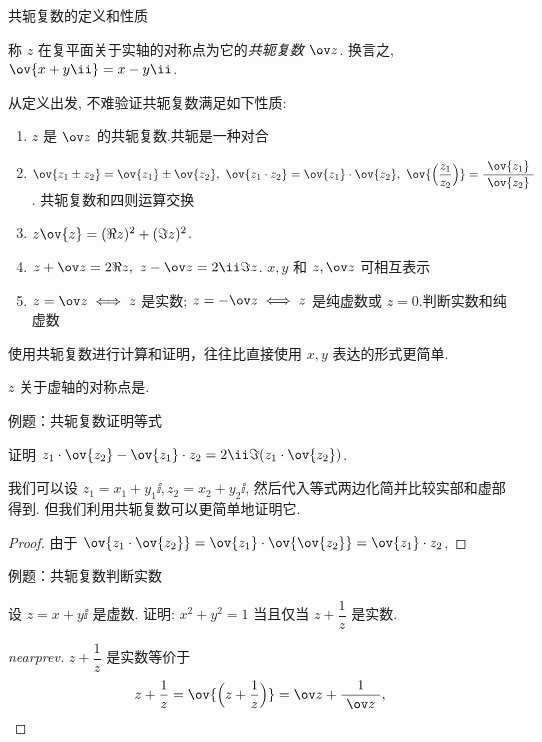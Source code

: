 \begin{frame}{共轭复数的定义和性质}
	\onslide<+->
	\begin{definition}
		称 $z$ 在复平面关于实轴的对称点为它的\emph{共轭复数 $\ov z$}.
		换言之, $\ov{x+y\ii}=x-y\ii$.
	\end{definition}
	\onslide<+->
	从定义出发, 不难验证共轭复数满足如下性质:
	\begin{enumerate}\bf
		\item $z$ 是 $\ov z$ 的共轭复数.\hfill\alert{共轭是一种对合}
		\item $\ov{z_1\pm z_2}=\ov{z_1}\pm\ov{z_2},\ 
		\ov{z_1\cdot z_2}=\ov{z_1}\cdot\ov{z_2},\ 
		\ov{\Bigl(\dfrac{z_1}{z_2}\Bigr)}=\dfrac{~\ov{z_1}~}{~\ov{z_2}~}$.
		\hfill \alert{共轭复数和四则运算交换}
		\item $z\ov{z}=(\Re z)^2+(\Im z)^2$.
		\item $z+\ov z=2\Re z,\ z-\ov z=2\ii\Im z$.
		\hfill \alert{$x,y$ 和 $z,\ov z$ 可相互表示}
		\item $z=\ov z\iff z$ 是实数; $z=-\ov z\iff z$ 是纯虚数或 $z=0$.\hfill\alert{判断实数和纯虚数}
	\end{enumerate}

	\onslide<+->
	使用共轭复数进行计算和证明，往往比直接使用 $x,y$ 表达的形式更简单.
	\onslide<+->
	\begin{exercise}
		$z$ 关于虚轴的对称点是.
	\end{exercise}
\end{frame}


\begin{frame}{例题：共轭复数证明等式}
	\onslide<+->
	\begin{example}
		证明 $z_1\cdot\ov{z_2}-\ov{z_1}\cdot z_2=2\ii\Im(z_1\cdot\ov{z_2})$.
	\end{example}
	\onslide<+->
	我们可以设 $z_1=x_1+y_1\ii,z_2=x_2+y_2\ii$, 然后代入等式两边化简并比较实部和虚部得到.
	\onslide<+->
	但我们利用共轭复数可以更简单地证明它.
	\onslide<+->
	\begin{proof}
		由于 $\ov{z_1\cdot\ov{z_2}}=\ov{z_1}\cdot\ov{\ov{z_2}}=\ov{z_1}\cdot z_2$, 
		\bigdel
	\end{proof}
\end{frame}


\begin{frame}{例题：共轭复数判断实数}
	\onslide<+->
	\begin{example}[nearnext]
		设 $z=x+y\ii$ 是虚数.
		证明: $x^2+y^2=1$ 当且仅当 $z+\dfrac 1z$ 是实数.
	\end{example}
	\onslide<+->
	\begin{proof}[nearprev]
		$z+\dfrac 1z$ 是实数等价于
		\[
			z+\dfrac 1z=\ov{\Bigl(z+\dfrac 1z\Bigr)}=\ov z+\dfrac1{~\ov z~},
		\]
		\onslide<+->{%
			等价于
			\[
				z-\ov z=\frac1{~\ov z~}-\frac1z=\frac{z-\ov z}{z\ov z},\qquad (z-\ov z)(z\ov z-1)=0.
			\]
		}
	\end{proof}
\end{frame}


